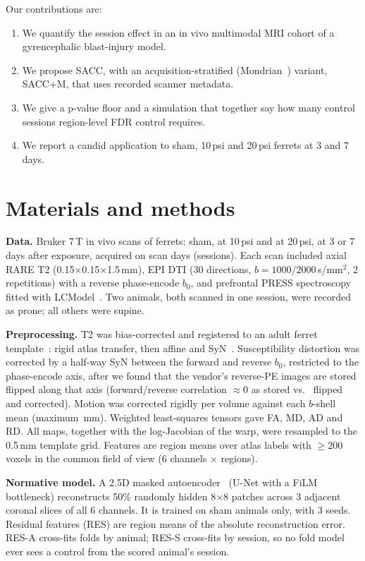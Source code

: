 \documentclass{article}
\begin{document}
Our contributions are:
\begin{enumerate}
\item We quantify the session effect in an in vivo multimodal MRI cohort of a gyrencephalic blast-injury model.
\item We propose SACC, with an acquisition-stratified (Mondrian~\cite{vovk2005}) variant, SACC+M, that uses recorded scanner metadata.
\item We give a p-value floor and a simulation that together say how many control sessions region-level FDR control requires.
\item We report a candid application to sham, 10\,psi and 20\,psi ferrets at 3 and 7 days.
\end{enumerate}

\section{Materials and methods}
\label{sec:methods}
\textbf{Data.} Bruker 7\,T in vivo scans of \Nanimals{} ferrets: \Nsham{} sham, \Ntenpsi{} at 10\,psi and \Ntwentypsi{} at 20\,psi, at 3 or 7 days after exposure, acquired on \Nsessions{} scan days (sessions). Each scan included axial RARE T2 (0.15$\times$0.15$\times$1.5\,mm), EPI DTI (30 directions, $b=1000/2000$\,s/mm$^2$, 2 repetitions) with a reverse phase-encode $b_0$, and prefrontal PRESS spectroscopy fitted with LCModel~\cite{provencher1993}. Two animals, both scanned in one session, were recorded as prone; all others were supine.

\textbf{Preprocessing.} T2 was bias-corrected and registered to an adult ferret template~\cite{hutchinson2017}: rigid atlas transfer, then affine and SyN~\cite{avants2008}. Susceptibility distortion was corrected by a half-way SyN between the forward and reverse $b_0$, restricted to the phase-encode axis, after we found that the vendor's reverse-PE images are stored flipped along that axis (forward/reverse correlation $\approx$0 as stored vs.\ \SDCbefore{} flipped and \SDCafter{} corrected). Motion was corrected rigidly per volume against each $b$-shell mean (maximum \Motion\,mm). Weighted least-squares tensors gave FA, MD, AD and RD. All maps, together with the log-Jacobian of the warp, were resampled to the 0.5\,mm template grid. Features are region means over \Nregions{} atlas labels with $\geq$200 voxels in the common field of view (6 channels $\times$ \Nregions{} regions).

\textbf{Normative model.} A 2.5D masked autoencoder~\cite{he2022} (U-Net with a FiLM bottleneck) reconstructs 50\% randomly hidden 8$\times$8 patches across 3 adjacent coronal slices of all 6 channels. It is trained on sham animals only, with 3 seeds. Residual features (RES) are region means of the absolute reconstruction error. RES-A cross-fits folds by animal; RES-S cross-fits by session, so no fold model ever sees a control from the scored animal's session.
\end{document}
